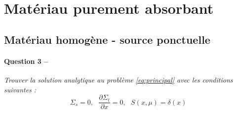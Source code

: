 \documentclass[11pt,a4paper]{article}
\newcommand{\dx}[1]{\dfrac{\partial #1}{\partial x}}
\newcommand{\question}[2]{\paragraph{Question #1 --}\hspace{-7pt}\textit{#2} \\}
\begin{document}
 
\section{Matériau purement absorbant}

\subsection{Matériau homogène - source ponctuelle}

\question{3}{Trouver la solution analytique au problème \autoref{eq:principal} avec les conditions suivantes :}

\begin{equation}
  \Sigma_s=0, ~~~ \dx{\Sigma_t} = 0, ~~~ S(x, \mu) = \delta(x)
\end{equation}
\end{document}
